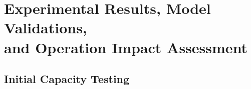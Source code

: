 \documentclass[10pt,twocolumn]{IEEEtran}
\begin{document}
%
%

\section{Experimental Results, Model Validations,\\ and Operation Impact Assessment} \label{sec:results}


\subsection{Initial Capacity Testing} \label{sec:capacity_test_1}
\end{document}
